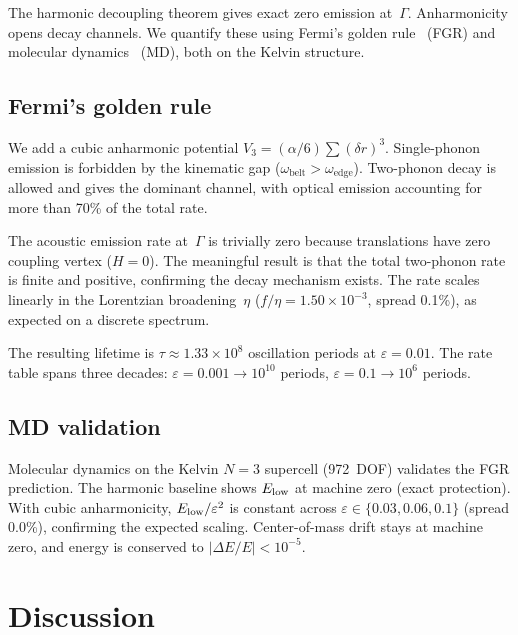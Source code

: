 \documentclass[12pt]{article}
\newcommand{\oedge}{\omega_{\mathrm{edge}}}
\newcommand{\obelt}{\omega_{\mathrm{belt}}}
\begin{document}
The harmonic decoupling theorem gives exact zero emission
at~$\Gamma$.  Anharmonicity opens decay channels.  We quantify these
using Fermi's golden rule~\cite{Sakurai} (FGR) and molecular
dynamics~\cite{Verlet1967} (MD), both on the Kelvin structure.

\subsection{Fermi's golden rule}
\label{sec:fgr}

We add a cubic anharmonic potential $V_3 = (\alpha/6) \sum (\delta
r)^3$.  Single-phonon emission is forbidden by the kinematic gap
($\obelt > \oedge$).  Two-phonon decay is allowed and gives the
dominant channel, with optical emission accounting for more than 70\%
of the total rate.

The acoustic emission rate at~$\Gamma$ is trivially zero because
translations have zero coupling vertex ($H = 0$).  The meaningful
result is that the total two-phonon rate is finite and positive,
confirming the decay mechanism exists.  The rate scales linearly in
the Lorentzian broadening~$\eta$ ($f/\eta = 1.50 \times 10^{-3}$,
spread 0.1\%), as expected on a discrete spectrum.

The resulting lifetime is $\tau \approx 1.33 \times 10^8$ oscillation
periods at $\varepsilon = 0.01$.  The rate table spans three decades:
$\varepsilon = 0.001 \to 10^{10}$ periods, $\varepsilon = 0.1 \to
10^6$ periods.

\subsection{MD validation}
\label{sec:md}

Molecular dynamics on the Kelvin $N = 3$ supercell (972~DOF)
validates the FGR prediction.  The harmonic baseline shows $E_{\rm
low}$ at machine zero (exact protection).  With cubic anharmonicity,
$E_{\rm low}/\varepsilon^2$ is constant across $\varepsilon \in
\{0.03, 0.06, 0.1\}$ (spread 0.0\%), confirming the expected scaling.
Center-of-mass drift stays at machine zero, and energy is conserved to
$|\Delta E/E| < 10^{-5}$.

\section{Discussion}
\label{sec:discussion}
\end{document}
